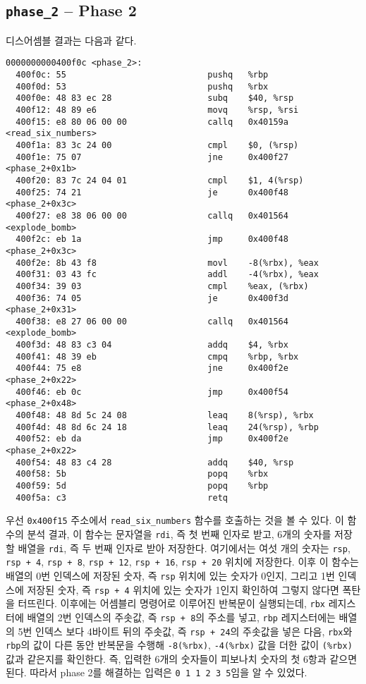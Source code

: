 \documentclass{scrartcl}
\begin{document}
\subsection{\texttt{phase\_2} -- Phase 2}
디스어셈블 결과는 다음과 같다.
\begin{lstlisting}
0000000000400f0c <phase_2>:
  400f0c: 55                            pushq   %rbp
  400f0d: 53                            pushq   %rbx
  400f0e: 48 83 ec 28                   subq    $40, %rsp
  400f12: 48 89 e6                      movq    %rsp, %rsi
  400f15: e8 80 06 00 00                callq   0x40159a <read_six_numbers>
  400f1a: 83 3c 24 00                   cmpl    $0, (%rsp)
  400f1e: 75 07                         jne     0x400f27 <phase_2+0x1b>
  400f20: 83 7c 24 04 01                cmpl    $1, 4(%rsp)
  400f25: 74 21                         je      0x400f48 <phase_2+0x3c>
  400f27: e8 38 06 00 00                callq   0x401564 <explode_bomb>
  400f2c: eb 1a                         jmp     0x400f48 <phase_2+0x3c>
  400f2e: 8b 43 f8                      movl    -8(%rbx), %eax
  400f31: 03 43 fc                      addl    -4(%rbx), %eax
  400f34: 39 03                         cmpl    %eax, (%rbx)
  400f36: 74 05                         je      0x400f3d <phase_2+0x31>
  400f38: e8 27 06 00 00                callq   0x401564 <explode_bomb>
  400f3d: 48 83 c3 04                   addq    $4, %rbx
  400f41: 48 39 eb                      cmpq    %rbp, %rbx
  400f44: 75 e8                         jne     0x400f2e <phase_2+0x22>
  400f46: eb 0c                         jmp     0x400f54 <phase_2+0x48>
  400f48: 48 8d 5c 24 08                leaq    8(%rsp), %rbx
  400f4d: 48 8d 6c 24 18                leaq    24(%rsp), %rbp
  400f52: eb da                         jmp     0x400f2e <phase_2+0x22>
  400f54: 48 83 c4 28                   addq    $40, %rsp
  400f58: 5b                            popq    %rbx
  400f59: 5d                            popq    %rbp
  400f5a: c3                            retq
\end{lstlisting}
우선 \texttt{0x400f15} 주소에서 \texttt{read\_six\_numbers} 함수를 호출하는
것을 볼 수 있다. 이 함수의 분석 결과, 이 함수는 문자열을 \texttt{rdi}, 즉 첫
번째 인자로 받고, 6개의 숫자를 저장할 배열을 \texttt{rdi}, 즉 두 번째 인자로
받아 저장한다. 여기에서는 여섯 개의 숫자는 \texttt{rsp}, \texttt{rsp + 4},
\texttt{rsp + 8}, \texttt{rsp + 12}, \texttt{rsp + 16}, \texttt{rsp + 20}
위치에 저장한다. 이후 이 함수는 배열의 0번 인덱스에 저장된 숫자, 즉
\texttt{rsp} 위치에 있는 숫자가 0인지, 그리고 1번 인덱스에 저장된 숫자, 즉
\texttt{rsp + 4} 위치에 있는 숫자가 1인지 확인하여 그렇지 않다면 폭탄을
터뜨린다. 이후에는 어셈블리 명령어로 이루어진 반복문이 실행되는데, \texttt{rbx}
레지스터에 배열의 2번 인덱스의 주솟값, 즉 \texttt{rsp + 8}의 주소를 넣고,
\texttt{rbp} 레지스터에는 배열의 5번 인덱스 보다 4바이트 뒤의 주솟값, 즉
\texttt{rsp + 24}의 주솟값을 넣은 다음, \texttt{rbx}와 \texttt{rbp}의 값이 다른
동안 반복문을 수행해 \texttt{-8(\%rbx)}, \texttt{-4(\%rbx)} 값을 더한 값이
\texttt{(\%rbx)} 값과 같은지를 확인한다. 즉, 입력한 6개의 숫자들이 피보나치
숫자의 첫 6항과 같으면 된다. 따라서 phase 2를 해결하는 입력은 \texttt{0 1 1 2 3
5}임을 알 수 있었다.
\end{document}
